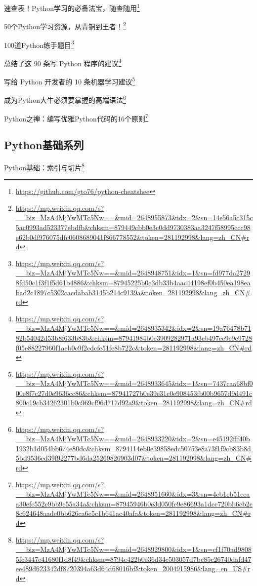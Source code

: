 \documentclass[]{ctexbook}
\renewcommand{\href}[2]{#2\footnote{\url{#1}}}
\begin{document}
\href{https://github.com/gto76/python-cheatshee}{速查表！Python学习的必备法宝，随查随用}

\href{https://mp.weixin.qq.com/s?__biz=MzA4MjYwMTc5Nw==\&mid=2648955873\&idx=2\&sn=14e56a5c315c5ac0993ad523377ebdfb\&chksm=879449cbb0e3c0dd9730383aa3247f58995ccc98e62b0df976075dfc0608689041f866778552\&token=281192998\&lang=zh_CN\#rd}{50个Python学习资源，从青铜到王者！}

\href{https://mp.weixin.qq.com/s?__biz=MzA4MjYwMTc5Nw==\&mid=2648948751\&idx=1\&sn=fd977da27298fd50c1f3f1f5d61b4886\&chksm=87945225b0e3db33b4aac44198ef0b450ea198eabad2c1897c5302cacdabab3145b214c9139a\&token=281192998\&lang=zh_CN\#rd}{100道Python练手题目}

\href{https://mp.weixin.qq.com/s?__biz=MzA4MjYwMTc5Nw==\&mid=2648935342\&idx=2\&sn=19a76478b7182b54042d53b8f633b83b\&chksm=87941984b0e3909282971a93cb497ee9c9e9728f05e88227960f1aeb0c9f2cdcfe51fe8b722c\&token=281192998\&lang=zh_CN\#rd}{总结了这 90 条写 Python 程序的建议}

\href{https://mp.weixin.qq.com/s?__biz=MzA4MjYwMTc5Nw==\&mid=2648933645\&idx=1\&sn=7437caa68bf000e8f7c27d0e9636cc86\&chksm=87941727b0e39e31c0e908453fb00b9657d9d491c800c19cb34262301b0c969cf96d717d92a9\&token=281192998\&lang=zh_CN\#rd}{写给 Python 开发者的 10 条机器学习建议}

\href{https://mp.weixin.qq.com/s?__biz=MzA4MjYwMTc5Nw==\&mid=2648933220\&idx=2\&sn=e45192fff40b1932b1d054bb674e80dc\&chksm=8794114eb0e39858edc50753e8a73f1f9cb83b8d5bd9536ed39f92277bd6da25269826903d07\&token=281192998\&lang=zh_CN\#rd}{成为Python大牛必须要掌握的高端语法}

\href{https://mp.weixin.qq.com/s?__biz=MzA4MjYwMTc5Nw==\&mid=2648951660\&idx=3\&sn=4cb1eb51ceaa30efc552e9bb9c55a34a\&chksm=87945946b0e3d050fe9e86693a1dcc720bb6cb2c8c624648aade0bb626ca6e5c1b641ac40afa\&token=281192998\&lang=zh_CN\#rd}{Python之禅：编写优雅Python代码的16个原则}

\hypertarget{pythonux57faux7840ux7cfbux5217}{%
\subsection{Python基础系列}\label{pythonux57faux7840ux7cfbux5217}}

\href{https://mp.weixin.qq.com/s?__biz=MzA4MjYwMTc5Nw==\&mid=2648929800\&idx=1\&sn=cf1f70ad98085fe3447e41680f1d8f49\&chksm=8794e422b0e36d34c503057d7bc85c26740dafd47ee489d623342df8720394a63d64d68016bf\&token=2004915986\&lang=en_US\#rd}{Python基础：索引与切片}
\end{document}
